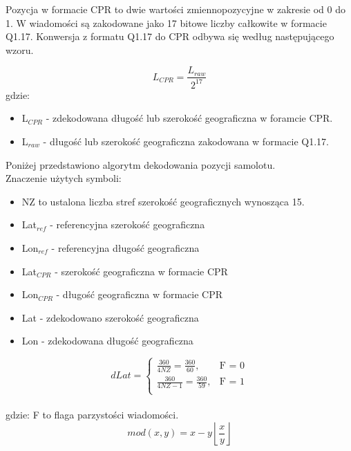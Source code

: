 \documentclass[eng,printmode]{mgr}
\newcommand{\floor}[1]{\left\lfloor #1 \right\rfloor}
\begin{document}
Pozycja w formacie CPR to dwie wartości zmiennopozycyjne w zakresie od 0 do 1. W wiadomości są zakodowane jako 17 bitowe liczby całkowite w formacie Q1.17. Konwersja z formatu Q1.17 do CPR odbywa się według następującego wzoru.

\begin{equation}
L_{CPR} = \frac{L_{raw}}{2^{17}}
\end{equation}
gdzie:
\begin{itemize}
\item L$_{CPR}$ - zdekodowana długość lub szerokość geograficzna w foramcie CPR.
\item L$_{raw}$ - długość lub szerokość geograficzna zakodowana w formacie Q1.17.
\end{itemize}

\noindent
Poniżej przedstawiono algorytm dekodowania pozycji samolotu.
\\


\noindent
Znaczenie użytych symboli:
\begin{itemize}
\item NZ to ustalona liczba stref szerokość geograficznych wynosząca 15.
\item Lat$_{ref}$ - referencyjna szerokość geograficzna
\item Lon$_{ref}$ - referencyjna długość geograficzna
\item Lat$_{CPR}$ - szerokość geograficzna w formacie CPR
\item Lon$_{CPR}$ - długość geograficzna w formacie CPR
\item Lat - zdekodowano szerokość geograficzna
\item Lon - zdekodowana długość geograficzna
\end{itemize}


\begin{equation}
\renewcommand*{\arraystretch}{1.3}
dLat= \left\{ \begin{array}{ll}

\frac{360}{4NZ} = \frac{360}{60}, & \textrm{F = 0}\\
\frac{360}{4NZ - 1} = \frac{360}{59}, & \textrm{F = 1}\\

\end{array} \right.
\end{equation}
\\
gdzie: F to flaga parzystości wiadomości.
\begin{equation}
mod(x, y) = x - y\floor{\frac{x}{y}}
\end{equation}
\end{document}

